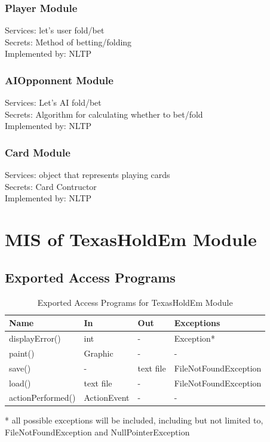 \documentclass[11pt]{article}
\begin{document}
    \subsubsection{Player Module}
    Services: let’s user fold/bet\\

    Secrets: Method of betting/folding\\

    Implemented by: NLTP\\

    \subsubsection{AIOpponnent Module}
    Services: Let’s AI fold/bet\\

    Secrets: Algorithm for calculating whether to bet/fold\\

    Implemented by: NLTP\\

    \subsubsection{Card Module}
    Services: object that represents playing cards\\

    Secrets: Card Contructor\\

    Implemented by: NLTP\\

    
    
    \section{MIS of TexasHoldEm Module}
    
    \subsection{Exported Access Programs}
    \begin{table}[H]
    \caption{Exported Access Programs for TexasHoldEm Module}
    \begin{tabular}{p{4cm}p{2cm}p{2cm}p{4cm}}
    Name & In & Out & Exceptions\\
    \hline
	displayError() & int & - & Exception*\\
	\hline
    paint() & Graphic & - & -\\
    \hline
    save() & - & text file & FileNotFoundException\\
    \hline
    load() & text file & - & FileNotFoundException\\
    \hline
    actionPerformed() & ActionEvent &  - & - \\
    \hline
    \end{tabular}
    * all possible exceptions will be included, including but not limited to, FileNotFoundException and NullPointerException
    \end{table}
    
\end{document}
